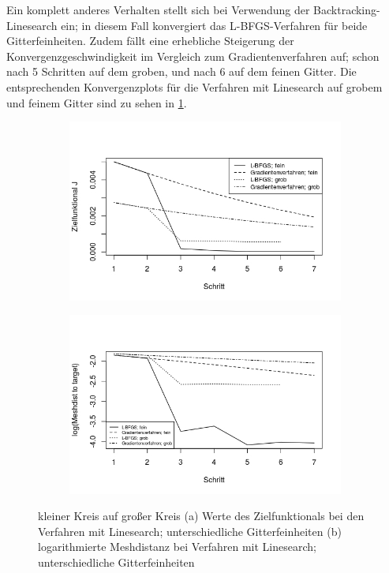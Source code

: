 Ein komplett anderes Verhalten stellt sich bei Verwendung der Backtracking-Linesearch ein; in diesem Fall konvergiert das L-BFGS-Verfahren für beide Gitterfeinheiten.
Zudem fällt eine erhebliche Steigerung der Konvergenzgeschwindigkeit im Vergleich zum Gradientenverfahren auf; schon nach 5 Schritten auf dem groben, und nach 6 auf dem feinen Gitter. Die entsprechenden Konvergenzplots für die Verfahren mit Linesearch auf grobem und feinem Gitter sind zu sehen in \ref{Konvplots_circle}.

\begin{figure}
	\begin{subfigure}{0.5\textwidth}
	\centering
	\includegraphics[scale=0.48]{plot_circle_target.jpeg}
	\caption{}	
	\end{subfigure}
	\begin{subfigure}{0.5\textwidth}
	\centering
	\includegraphics[scale=0.48]{plot_circle_meshdist.jpeg}
	\caption{}	
	\end{subfigure}
\caption{kleiner Kreis auf großer Kreis (a) Werte des Zielfunktionals bei den Verfahren mit Linesearch; unterschiedliche Gitterfeinheiten (b) logarithmierte Meshdistanz bei Verfahren mit Linesearch; unterschiedliche Gitterfeinheiten}
\label{Konvplots_circle}
\end{figure}

